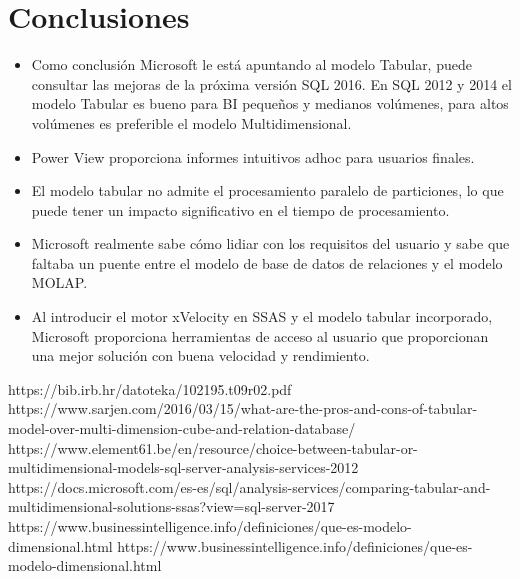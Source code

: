\documentclass[preprint,12pt]{elsarticle}
\begin{document}
\section{Conclusiones}


\begin{itemize}
	\item Como conclusión Microsoft le está apuntando al modelo Tabular, puede consultar las mejoras de la próxima versión SQL 2016. En SQL 2012 y 2014 el modelo Tabular es bueno para BI pequeños y medianos volúmenes, para altos volúmenes es preferible el modelo Multidimensional.
	\item Power View proporciona informes intuitivos adhoc para usuarios finales. 
	\item El modelo tabular no admite el procesamiento paralelo de particiones, lo que puede tener un impacto significativo en el tiempo de procesamiento.
	\item Microsoft realmente sabe cómo lidiar con los requisitos del usuario y sabe que faltaba un puente entre el modelo de base de datos de relaciones y el modelo MOLAP. 
	\item Al introducir el motor xVelocity en SSAS y el modelo tabular incorporado, Microsoft proporciona herramientas de acceso al usuario que proporcionan una mejor solución con buena velocidad y rendimiento. 
\end{itemize}

	
	

	
	\newpage
	
	   \begin{thebibliography}{0}
               https://bib.irb.hr/datoteka/102195.t09r02.pdf 
                  https://www.sarjen.com/2016/03/15/what-are-the-pros-and-cons-of-tabular-model-over-multi-dimension-cube-and-relation-database/
                  https://www.element61.be/en/resource/choice-between-tabular-or-multidimensional-models-sql-server-analysis-services-2012
                   https://docs.microsoft.com/es-es/sql/analysis-services/comparing-tabular-and-multidimensional-solutions-ssas?view=sql-server-2017
  https://www.businessintelligence.info/definiciones/que-es-modelo-dimensional.html
                     https://www.businessintelligence.info/definiciones/que-es-modelo-dimensional.html


         \end{thebibliography}
	
\end{document}
